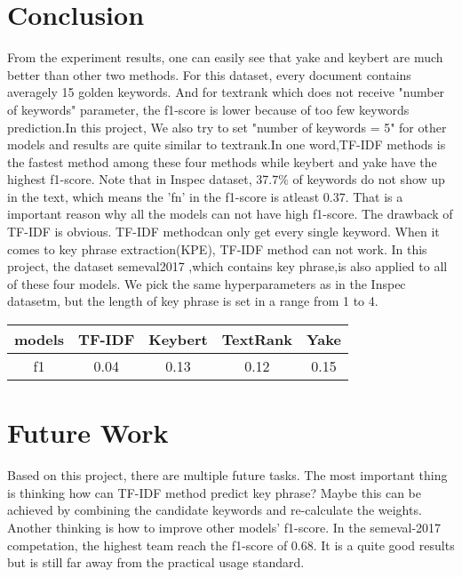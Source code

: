 \documentclass[11pt,a4paper]{article}
\begin{document}
\section{Conclusion}
From the experiment results, one can easily see that yake and keybert are much better than other two methods. For this 
dataset, every document contains averagely 15 golden keywords. And for textrank which does not receive "number of keywords" parameter,
the f1-score is lower because of too few keywords prediction.In this project, We also try to set "number of keywords = 5" for other
models and results are quite similar to textrank.In one word,TF-IDF methods is the fastest method among these four methods while keybert and yake have the highest f1-score.
\vspace{11pt}
\noindent
Note that in Inspec dataset, 37.7$\%$ of keywords do not show up in the text, which means the 'fn' in the f1-score is atleast
0.37. That is a important reason why all the models can not have high f1-score.
\vspace{11pt}
\noindent
The drawback of TF-IDF is obvious. TF-IDF methodcan only get every single keyword. When it comes
to key phrase extraction(KPE), TF-IDF method can not work. In this project, the dataset semeval2017 \cite{augenstein-etal-2017-semeval} 
,which contains key phrase,is also applied to all of these four models. We pick the same hyperparameters as in the Inspec datasetm, but the length
of key phrase is set in a range from 1 to 4.
\vspace{11pt}
\begin{center}
    \begin{tabular}{ccccc}
        \hline
        models& TF-IDF& Keybert& TextRank& Yake\\
        \hline
        f1& 0.04& 0.13& 0.12& 0.15 \\
        \hline
    \end{tabular}
\end{center}
\noindent

\section{Future Work}
Based on this project, there are multiple future tasks. The most important thing is thinking how can
TF-IDF method predict key phrase? Maybe this can be achieved by combining the candidate keywords and re-calculate
the weights. Another thinking is how to improve other models' f1-score.
\vspace{11pt}
\noindent
In the semeval-2017 competation, the highest team reach the f1-score of 0.68. It is a quite good results but is still
far away from the practical usage standard.
\end{document}
